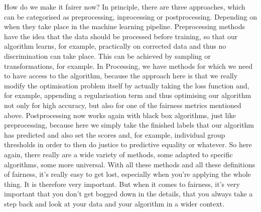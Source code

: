 How do we make it fairer now? In principle, there are three approaches, which can be categorised as preprocessing, inprocessing or postprocessing. Depending on when they take place in the machine learning pipeline. Preprocessing methods have the idea that the data should be processed before training, so that our algorithm learns, for example, practically on corrected data and thus no discrimination can take place. This can be achieved by sampling or transformations, for example. In Processing, we have methods for which we need to have access to the algorithm, because the approach here is that we really modify the optimisation problem itself by actually taking the loss function and, for example, appending a regularisation term and thus optimising our algorithm not only for high accuracy, but also for one of the fairness metrics mentioned above. Postprocessing now works again with black box algorithms, just like preprocessing, because here we simply take the finished labels that our algorithm has predicted and also set the scores and, for example, individual group thresholds in order to then do justice to predictive equality or whatever. So here again, there really are a wide variety of methods, some adapted to specific algorithms, some more universal. With all these methods and all these definitions of fairness, it's really easy to get lost, especially when you're applying the whole thing. It is therefore very important. But when it comes to fairness, it's very important that you don't get bogged down in the details, that you always take a step back and look at your data and your algorithm in a wider context.

